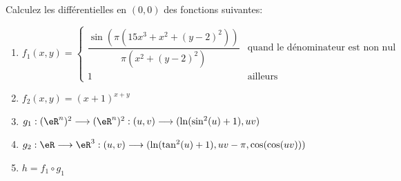 
\begin{exercice}\label{exo0051}



	Calculez les différentielles en  $(0,0)$ des fonctions suivantes:

	\begin{enumerate}
		\item $f_1(x,y)=\left\{\begin{array}{cl}
				      \dfrac{\sin(\pi(15x^3+x^2+(y-2)^2))}{\pi(x^2+(y-2)^2)} & \text{quand le dénominateur est non nul} \\
				      1                                                      & \text{ailleurs}
			      \end{array}\right.$
		\item $f_2(x,y)= (x+1)^{x+y}$
		\item $g_1:(\eR^n)^2\longrightarrow(\eR^n)^2:(u,v)\longrightarrow(\ln(\sin^2(u)+1),uv)$
		\item $g_2:\eR\longrightarrow\eR^3:(u,v)\longrightarrow(\ln(\tan^2(u)+1),uv-\pi, \cos(\cos(uv)))$
		\item $h=f_1\circ g_1$
	\end{enumerate}

\end{exercice}

